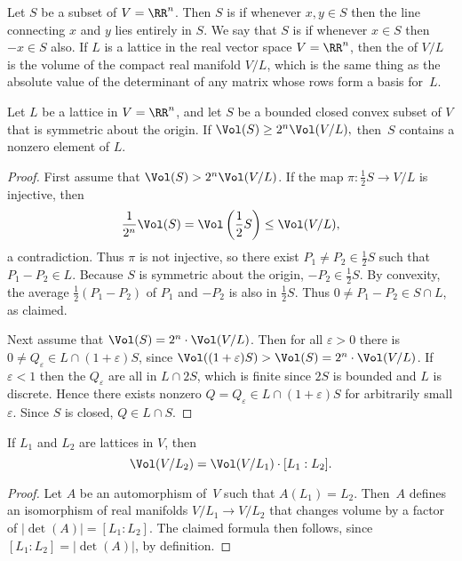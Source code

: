 Let $S$ be a subset of $V=\RR^n$.  Then $S$ is  if
whenever $x,y\in S$ then the line connecting $x$ and $y$ lies entirely
in $S$.  We say that $S$ is  if
whenever $x\in S$ then $-x\in S$ also.  If $L$ is a lattice in the
real vector space $V=\RR^n$, then the  of $V/L$ is the
volume of the compact real manifold $V/L$, which is the same thing as
the absolute value of the determinant of any matrix whose rows form a
basis for~$L$.
\begin{lemma}[Blichfeld]\label{lem:blichfeld}
	Let $L$ be a lattice in $V=\RR^n$, and let $S$ be a
	bounded closed convex subset of $V$ that is symmetric about the
	origin.  If
	$\Vol(S)\geq 2^n \Vol(V/L),$
	then~$S$ contains a nonzero element of $L$.
\end{lemma}
\begin{proof}
	First assume that $\Vol(S)>2^n \Vol(V/L)$.
	If the map $\pi: \frac{1}{2}S \to V/L$ is injective, then
	$$
	\frac{1}{2^n}\Vol(S) = \Vol\left(\frac{1}{2} S\right)\leq \Vol(V/L),
	$$
	a contradiction.  Thus $\pi$ is not injective, so there
	exist $P_1\neq P_2\in \frac{1}{2}S$ such that $P_1-P_2\in L$.
	Because $S$ is symmetric about the origin, $-P_2\in \frac{1}{2}S$.
	By convexity, the average $\frac{1}{2}(P_1-P_2)$ of $P_1$ and $-P_2$
	is also in $\frac{1}{2}S$.  Thus $0 \neq P_1 - P_2 \in S \cap L$,
	as claimed.

	Next assume that $\Vol(S) = 2^n\cdot \Vol(V/L)$.  Then for all
	$\varepsilon > 0$ there is $0\neq Q_\varepsilon \in L \cap (1 + \varepsilon) S$,
	since $\Vol((1 + \varepsilon)S) > \Vol(S) = 2^n \cdot \Vol(V/L)$.
	If $\varepsilon < 1$ then the $Q_\varepsilon$ are all in $L \cap 2 S$,
	which is finite since $2S$ is bounded and $L$ is discrete.
	Hence there exists nonzero $Q = Q_\varepsilon \in L\cap (1 + \varepsilon) S$
	for arbitrarily small $\varepsilon$.
	Since $S$ is closed, $Q \in L \cap S$.
\end{proof}

\begin{lemma}\label{lem:latticevolchange}
	If $L_1$ and $L_2$ are lattices in $V$, then
	\[
		\Vol(V/L_2) = \Vol(V/L_1) \cdot [L_1:L_2].
	\]
\end{lemma}
\begin{proof}
	Let $A$ be an automorphism of~$V$ such that $A(L_1)=L_2$.  Then~$A$
	defines an isomorphism of real manifolds $V/L_1\to V/L_2$ that changes
	volume by a factor of $\left|\det(A)\right|=[L_1:L_2]$.
	The claimed formula then follows,
	since $[L_1:L_2] = \left|\det(A)\right|$, by definition.
\end{proof}

